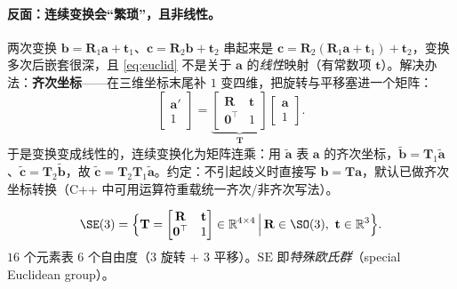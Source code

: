 \paragraph{反面：连续变换会“繁琐”，且非线性。}两次变换 $\mathbf{b}=\mathbf{R}_1\mathbf{a}+\mathbf{t}_1$、$\mathbf{c}=\mathbf{R}_2\mathbf{b}+\mathbf{t}_2$ 串起来是 $\mathbf{c}=\mathbf{R}_2(\mathbf{R}_1\mathbf{a}+\mathbf{t}_1)+\mathbf{t}_2$，变换多次后嵌套很深，且 \cref{eq:euclid} 不是关于 $\mathbf{a}$ 的\emph{线性}映射（有常数项 $\mathbf{t}$）。解决办法：\textbf{齐次坐标}——在三维坐标末尾补 $1$ 变四维，把旋转与平移塞进一个矩阵：
\begin{equation}
  \begin{bmatrix}\mathbf{a}'\\1\end{bmatrix}
  =\underbrace{\begin{bmatrix}\mathbf{R}&\mathbf{t}\\\mathbf{0}^\top&1\end{bmatrix}}_{\mathbf{T}}
  \begin{bmatrix}\mathbf{a}\\1\end{bmatrix}.
  \label{eq:homo}
\end{equation}
于是变换变成线性的，连续变换化为矩阵连乘：用 $\tilde{\mathbf{a}}$ 表 $\mathbf{a}$ 的齐次坐标，$\tilde{\mathbf{b}}=\mathbf{T}_1\tilde{\mathbf{a}}$、$\tilde{\mathbf{c}}=\mathbf{T}_2\tilde{\mathbf{b}}$，故 $\tilde{\mathbf{c}}=\mathbf{T}_2\mathbf{T}_1\tilde{\mathbf{a}}$。约定：不引起歧义时直接写 $\mathbf{b}=\mathbf{T}\mathbf{a}$，默认已做齐次坐标转换（C++ 中可用运算符重载统一齐次/非齐次写法）。

\begin{definition}[特殊欧氏群 $\SE(3)$]\label{def:se3-rep}
\begin{equation}
  \SE(3)=\Big\{\mathbf{T}=\begin{bmatrix}\mathbf{R}&\mathbf{t}\\\mathbf{0}^\top&1\end{bmatrix}\in\mathbb{R}^{4\times4}\,\Big|\,\mathbf{R}\in\SO(3),\ \mathbf{t}\in\mathbb{R}^3\Big\}.
\end{equation}
$16$ 个元素表 $6$ 个自由度（$3$ 旋转 $+$ $3$ 平移）。$\mathrm{SE}$ 即\emph{特殊欧氏群}（special Euclidean group）。
\end{definition}

